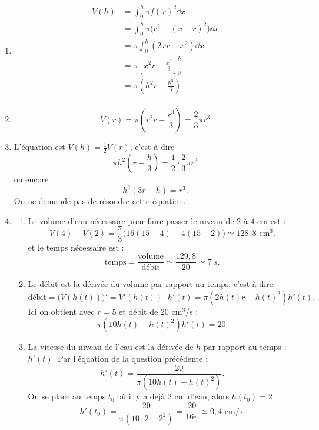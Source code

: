 \documentclass[11pt,class=report,crop=false]{standalone}
\begin{document}
\sauteligne
\begin{enumerate}
  \item 
\begin{align*}
V(h) 
  &= \int_0^h \pi f(x)^2 \dd x \\
  &= \int_0^h \pi\big( r^2 - (x-r)^2\big) \dd x \\
  &= \pi\int_0^h (2xr-x^2) \dd x \\
  &= \pi\left[ x^2r-\frac{x^3}{3} \right]_0^h \\
  &= \pi\left(h^2r-\frac{h^3}{3} \right) \\
\end{align*}
  \item 
$$V(r) =  \pi\left(r^2r-\frac{r^3}{3} \right) = \frac23 \pi r^3$$

  \item L'équation est $V(h) = \frac12 V(r)$, c'est-à-dire
$$\pi h^2\left(r-\frac{h}{3} \right) = \frac12\cdot \frac23 \pi r^3$$
ou encore
$$h^2(3r-h) = r^3.$$
On ne demande pas de résoudre cette équation.
  \item 
  \begin{enumerate}
     \item Le volume d'eau nécessaire pour faire passer le niveau de $2$ à $4$ cm est :
$$V(4) - V(2) = \frac\pi3\big( 16(15-4) -4(15-2) \big) \simeq 128,8 \text{ cm$^3$}.$$
et le temps nécessaire est :
$$\text{temps} = \frac{\text{volume}}{\text{débit}} \simeq \frac{129,8}{20} \simeq 7 \text{ s}.$$

     \item Le débit est la dérivée du volume par rapport au temps, c'est-à-dire 
$$\text{débit} = \big( V(h(t)) \big)' = V'(h(t))\cdot h'(t) = \pi ( 2h(t)r-h(t)^2)h'(t).$$
Ici on obtient avec $r=5$ et débit de $20$ cm$^3$/s :
$$\pi ( 10h(t)-h(t)^2)h'(t) = 20.$$


     \item La vitesse du niveau de l'eau est la dérivée de $h$ par rapport au temps : $h'(t)$.
Par l'équation de la question précédente :
$$h'(t) = \frac{20}{\pi(10h(t)-h(t)^2)}.$$
On se place au temps $t_0$ où il y a déjà $2$ cm d'eau, alors $h(t_0)=2$
$$h'(t_0) = \frac{20}{\pi(10\cdot 2-2^2)} = \frac{20}{16\pi} \simeq 0,4 \text{ cm/s}.$$

  \end{enumerate}
\end{enumerate}
\fincorrection
\finexercice
\end{document}
